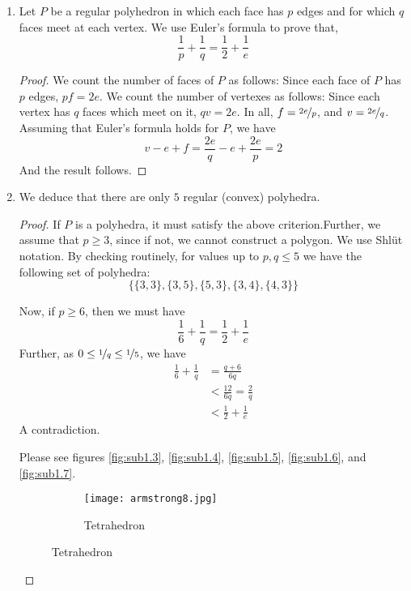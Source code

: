 \documentclass{book}
\begin{document}
\begin{enumerate}
    \item Let $P$ be a regular polyhedron in which each face has $p$ edges and for which $q$ faces meet at each vertex. We use Euler's formula to prove that,
        $$ \frac{1}{p} + \frac{1}{q} = \frac{1}{2} + \frac{1}{e} $$
        \begin{proof} We count the number of faces of $P$ as follows: Since each face of $P$ has $p$ edges, $pf = 2e$. We count the number of vertexes as follows: Since each vertex has $q$ faces which meet on it, $qv = 2e$. In all, $f = \nicefrac{2e}{p}$, and $v = \nicefrac{2e}{q}$. Assuming that Euler's formula holds for $P$, we have 
            $$v - e + f = \frac{2e}{q} - e + \frac{2e}{p} = 2$$
            And the result follows. 
        \end{proof}

    \item We deduce that there are only $5$ regular (convex) polyhedra. 
        \begin{proof} If $P$ is a polyhedra, it must satisfy the above criterion.Further, we assume that $p \geq 3$, since if not, we cannot construct a polygon. We use Shl{\"u}t notation. By checking routinely, for values up to $p,q \leq 5$ we have the following set of polyhedra: 
            $$\{ \{3,3\}, \{3,5\}, \{5,3\}, \{3,4\} , \{4,3\}\}$$
            \par Now, if $p \geq 6$, then we must have
            $$ \frac{1}{6} + \frac{1}{q} = \frac{1}{2} + \frac{1}{e}$$
            Further, as $0 \leq \nicefrac{1}{q} \leq \nicefrac{1}{5}$, we have 
            \begin{align*}
                \frac{1}{6} + \frac{1}{q} & = \frac{q+6}{6q} \\
                & < \frac{12}{6q} = \frac{2}{q} \\
                & < \frac{1}{2} + \frac{1}{e}
            \end{align*}
            A contradiction. 
            \par Please see figures \hyperref[fig:sub1.3]{\ref{fig:sub1.3}}, \hyperref[fig:sub1.4]{\ref{fig:sub1.4}}, \hyperref[fig:sub1.5]{\ref{fig:sub1.5}}, \hyperref[fig:sub1.6]{\ref{fig:sub1.6}}, and \hyperref[fig:sub1.7]{\ref{fig:sub1.7}}.
            \begin{figure}
                \centering
                \begin{subfigure}{.5\textwidth}
                    \centering
                    \texttt{[image: armstrong8.jpg]}
                    \caption{Tetrahedron}

\end{subfigure}
\end{figure}
\end{proof}
\end{enumerate}
\end{document}
